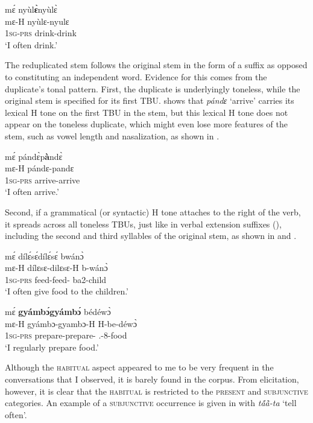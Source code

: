\ea\label{habitual}
  \glll  mɛ́ nyùl{\bfseries ɛ̀}nyùlɛ̀ \\
            mɛ-H nyùlɛ-nyulɛ \\
             1\textsc{sg}-\textsc{prs} drink-drink\\
    \trans `I often drink.'
\z

The reduplicated stem follows the original stem in the form of a suffix as opposed to constituting an independent word. Evidence for this comes from the duplicate's tonal pattern.  First, the duplicate is underlyingly toneless, while the original stem is specified for its first TBU.  shows that {\itshape pándɛ} `arrive' carries its lexical H tone on the first TBU in the stem, but this lexical H tone does not appear on the toneless duplicate, which might even lose more features of the stem, such as vowel length and nasalization, as shown in .

\ea\label{habitual1}
  \glll  mɛ́ pándɛ̀p{\bfseries à}ndɛ̀ \\
            mɛ-H pándɛ-pandɛ  \\
             1\textsc{sg}-\textsc{prs} arrive-arrive\\
    \trans `I often arrive.'
\z

Second, if a grammatical (or syntactic) H tone attaches to the right of the verb, it spreads across all toneless TBUs, just like in verbal extension suffixes (), including the second and third syllables of the original stem, as shown in  and .

\ea \label{habituala}
  \glll  mɛ́ dílɛ́sɛ́dílɛ́sɛ́ bwánɔ̀ \\
            mɛ-H dílɛsɛ-dilɛsɛ-H b-wánɔ̀ \\
             1\textsc{sg}-\textsc{prs} feed-feed-{\R} ba2-child\\
    \trans `I often give food to the children.'
\z

\ea\label{HAB1}
  \glll     mɛ́ {\bfseries gyámbɔ́gyámbɔ́} bédéwɔ̀ \\
            mɛ-H gyámbɔ-gyambɔ-H H-be-déwɔ̀ \\
              1\textsc{sg}-\textsc{prs} prepare-prepare-{\R} {\OBJ}.{\LINK}-8-food\\
    \trans `I regularly prepare food.'
\z


Although the \textsc{habitual} aspect appeared to me to be very frequent in the conversations that I observed, it is barely found in the corpus. From elicitation, however, it is clear that the \textsc{habitual} is restricted to the \textsc{present} and \textsc{subjunctive} categories. An example of a \textsc{subjunctive} occurrence is given in  with {\itshape tã́ã̀-ta} `tell often'.


